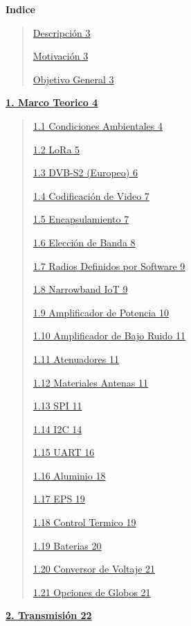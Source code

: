 \documentclass[12pt,a4paper]{article}
\author{}
\date{}
\begin{document}
\textbf{Indice}

\begin{quote}
\hyperref[descripciuxf3n]{Descripción 3}

\hyperref[motivaciuxf3n]{Motivación 3}

\hyperref[objetivo-general]{Objetivo General 3}
\end{quote}

\hyperref[marco-teorico]{\textbf{1. Marco Teorico 4}}

\begin{quote}
\hyperref[condiciones-ambientales]{1.1 Condiciones Ambientales 4}

\hyperref[lora]{1.2 LoRa 5}

\hyperref[dvb-s2-europeo]{1.3 DVB-S2 (Europeo) 6}

\hyperref[codificaciuxf3n-de-video]{1.4 Codificación de Video 7}

\hyperref[encapsulamiento]{1.5 Encapsulamiento 7}

\hyperref[elecciuxf3n-de-banda]{1.6 Elección de Banda 8}

\hyperref[radios-definidos-por-software]{1.7 Radios Definidos por Software 9}

\hyperref[narrowband-iot]{1.8 Narrowband IoT 9}

\hyperref[amplificador-de-potencia]{1.9 Amplificador de Potencia 10}

\hyperref[amplificador-de-bajo-ruido]{1.10 Amplificador de Bajo Ruido 11}

\hyperref[atenuadores]{1.11 Atenuadores 11}

\hyperref[construcciuxf3n-y-materiales-antenas]{1.12 Materiales Antenas 11}

\hyperref[spi]{1.13 SPI 11}

\hyperref[i2c]{1.14 I2C 14}

\hyperref[uart]{1.15 UART 16}

\hyperref[aluminio]{1.16 Aluminio 18}

\hyperref[eps]{1.17 EPS 19}

\hyperref[control-termico]{1.18 Control Termico 19}

\hyperref[baterias]{1.19 Baterias 20}

\hyperref[conversor-de-voltaje]{1.20 Conversor de Voltaje 21}

\hyperref[opciones-de-globos]{1.21 Opciones de Globos 21}
\end{quote}

\hyperref[transmisiuxf3n]{\textbf{2. Transmisión 22}}
\end{document}
